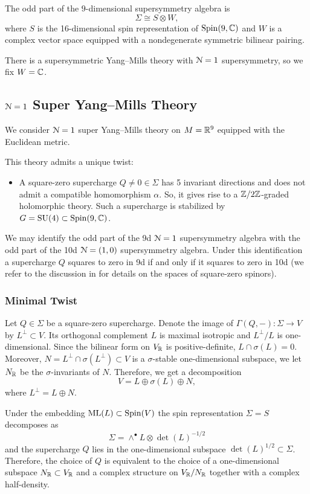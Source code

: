 \documentclass[10pt, oneside]{article}
\begin{document}
The odd part of the $9$-dimensional supersymmetry algebra is 
\[
\Sigma\cong S\otimes W,
\] 
where $S$ is the 16-dimensional spin representation of $\mathrm{Spin}(9, \mathbb C)$ and $W$ is a complex vector space equipped with a nondegenerate symmetric bilinear pairing. 

There is a supersymmetric Yang--Mills theory with $\mathcal{N}=1$ supersymmetry, so we fix $W = \mathbb C$.

\subsection{\texorpdfstring{$\mathcal N=1$}{N=1} Super Yang--Mills Theory}

We consider $\mathcal N=1$ super Yang--Mills theory on $M=\mathbb R^9$ equipped with the Euclidean metric.

This theory admits a unique twist:
\begin{itemize}
\item A square-zero supercharge $Q\neq 0\in\Sigma$ has 5 invariant directions and does not admit a compatible homomorphism $\alpha$. So, it gives rise to a $\mathbb Z/2\mathbb Z$-graded holomorphic theory. Such a supercharge is stabilized by $G=\mathrm{SU}(4)\subset \mathrm{Spin}(9, \mathbb C)$.
\end{itemize}

We may identify the odd part of the 9d $\mathcal{N}=1$ supersymmetry algebra with the odd part of the 10d $\mathcal{N}=(1, 0)$ supersymmetry algebra. Under this identification a supercharge $Q$ squares to zero in 9d if and only if it squares to zero in 10d (we refer to the discussion in \cite[Section 4.8--4.10]{ElliottSafronov} for details on the spaces of square-zero spinors).

\subsubsection{Minimal Twist}
\label{sect:9dminimaltwist}

Let $Q\in\Sigma$ be a square-zero supercharge. Denote the image of $\Gamma(Q, -)\colon \Sigma\rightarrow V$ by $L^\perp\subset V$. Its orthogonal complement $L$ is maximal isotropic and $L^{\perp}/L$ is one-dimensional. Since the bilinear form on $V_\mathbb R$ is positive-definite, $L\cap \sigma(L) = 0$. Moreover, $N = L^{\perp}\cap \sigma(L^{\perp})\subset V$ is a $\sigma$-stable one-dimensional subspace, we let $N_\mathbb R$ be the $\sigma$-invariants of $N$. Therefore, we get a decomposition
\[V = L\oplus \sigma(L)\oplus N,\]
where $L^{\perp} = L\oplus N$.

Under the embedding $\mathrm{ML}(L)\subset \mathrm{Spin}(V)$ the spin representation $\Sigma=S$ decomposes as
\[\Sigma = \wedge^\bullet L\otimes \det(L)^{-1/2}\]
and the supercharge $Q$ lies in the one-dimensional subspace $\det(L)^{1/2}\subset \Sigma$. Therefore, the choice of $Q$ is equivalent to the choice of a one-dimensional subspace $N_\mathbb R\subset V_\mathbb R$ and a complex structure on $V_\mathbb R/N_\mathbb R$ together with a complex half-density.
\end{document}
